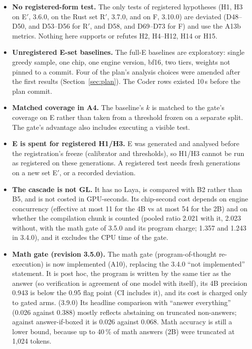 \documentclass[11pt,a4paper]{article}
\begin{document}
\begin{itemize}
\item \textbf{No registered-form test.} The only tests of registered hypotheses (H1, H3 on E$'$, 3.6.0, on the Rust set R$'$, 3.7.0, and on F, 3.10.0) are deviated (D48--D50, and D53--D56 for R$'$, and D58, and D69--D73 for F) and use the A13b metrics. Nothing here supports or refutes
  H2, H4--H12, H14 or H15.
\item \textbf{Unregistered E-set baselines.} The full-E baselines are exploratory: single greedy
  sample, one chip, one engine version, bf16, two tiers, weights not pinned to a commit. Four of the
  plan's analysis choices were amended after the first results (Section~\ref{sec:plan}). The Coder
  rows existed 10\,s before the plan commit.
\item \textbf{Matched coverage in A4.} The baseline's $k$ is matched to the gate's coverage on E
  rather than taken from a threshold frozen on a separate split. The gate's advantage also includes
  executing a visible test.
\item \textbf{E is spent for registered H1/H3.} E was generated and analysed before the
  registration's freeze (calibrator and thresholds), so H1/H3 cannot be run as registered on these
  generations. A registered test needs fresh generations on a new set E$'$, or a recorded deviation.
\item \textbf{The cascade is not GL.} It has no Laya, is compared with B2 rather than B5, and is
  not costed in GPU-seconds. Its chip-second cost depends on engine concurrency (effective at most
  11 for the 4B vs at most 54 for the 2B) and on whether the compilation chunk is counted (pooled
  ratio 2.021 with it, 2.023 without, with the math gate of 3.5.0 and its program charge; 1.357 and 1.243 in 3.4.0), and it excludes the CPU
  time of the gate.
\item \textbf{Math gate (revision 3.5.0).} The math gate (program-of-thought re-execution) is now
  implemented (A10), replacing the 3.4.0 ``not implemented'' statement. It is post hoc, the program is written by
  the same tier as the answer (so verification is agreement of one model with itself), its 4B precision 0.943 is
  below the 0.95 flag point (CI includes it), and its cost is charged only to gated arms. (3.9.0) Its headline comparison with ``answer everything'' (0.026 against 0.388) mostly reflects abstaining on truncated non-answers; against answer-if-boxed it is 0.026 against 0.068. Math accuracy is still a
  lower bound, because up to 40\,\% of math answers (2B) were truncated at 1,024 tokens.

\end{itemize}
\end{document}
